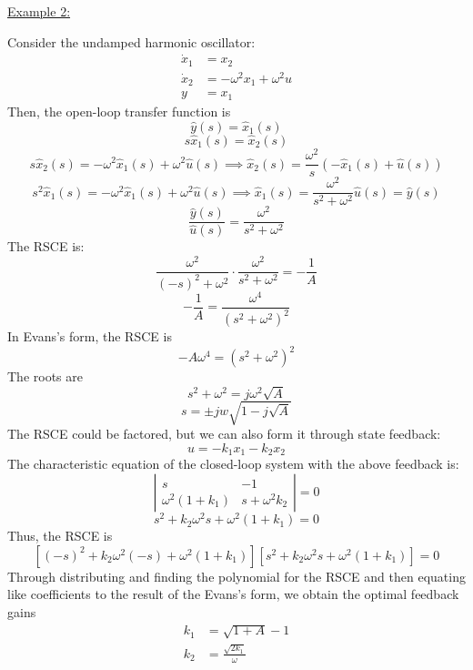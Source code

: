 \documentclass{article}
\begin{document}
\noindent
\underline{Example 2:}

\noindent
Consider the undamped harmonic oscillator:
\begin{align*}
    \dot{x}_1 &= x_2 \\
    \dot{x}_2 &= -\omega^2 x_1 + \omega^2 u \\
    y &= x_1
\end{align*}
Then, the open-loop transfer function is
\[\hat{y}(s) = \hat{x}_1(s)\]
\[s\hat{x}_1(s) = \hat{x}_2(s)\]
\[s\hat{x}_2(s) = -\omega^2\hat{x}_1(s)+\omega^2\hat{u}(s)
\implies \hat{x}_2(s) = \frac{\omega^2}{s}(-\hat{x}_1(s)+\hat{u}(s))\]
\[s^2\hat{x}_1(s) = -\omega^2\hat{x}_1(s)+\omega^2\hat{u}(s)
\implies \hat{x}_1(s) = \frac{\omega^2}{s^2+\omega^2}\hat{u}(s) = \hat{y}(s)\]
\[\frac{\hat{y}(s)}{\hat{u}(s)} = \frac{\omega^2}{s^2+\omega^2}\]
The RSCE is:
\[\frac{\omega^2}{(-s)^2+\omega^2}\cdot\frac{\omega^2}{s^2+\omega^2} = -\frac{1}{A}\]
\[-\frac{1}{A} = \frac{\omega^4}{(s^2+\omega^2)^2}\]
In Evans's form, the RSCE is
\[-A\omega^4 = (s^2+\omega^2)^2\]
The roots are
\[s^2+\omega^2 = j\omega^2\sqrt{A}\]
\[s = \pm jw\sqrt{1-j\sqrt{A}}\]
The RSCE could be factored, but we can also form it through state feedback:
\[u = -k_1x_1 - k_2x_2\]
The characteristic equation of the closed-loop system with the above feedback is:
\[\left|\begin{matrix}
    s & -1 \\
    \omega^2(1+k_1) & s+\omega^2k_2
\end{matrix}\right| = 0\]
\[s^2 + k_2\omega^2s + \omega^2(1+k_1) = 0\]
Thus, the RSCE is
\[[(-s)^2+k_2\omega^2(-s)+\omega^2(1+k_1)][s^2+k_2\omega^2s+\omega^2(1+k_1)] = 0\]
Through distributing and finding the polynomial for the RSCE and then equating
like coefficients to the result of the Evans's form, we obtain the optimal feedback gains
\begin{align*}
    k_1 &= \sqrt{1+A}-1 \\
    k_2 &= \frac{\sqrt{2k_1}}{\omega}
\end{align*}
\end{document}
